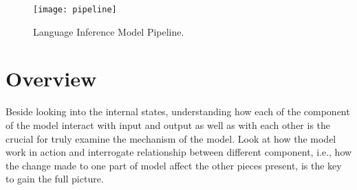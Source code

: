 \begin{figure}[htbp]
\centering
\vspace{-2mm}
 \texttt{[image: pipeline]}
 \caption{Language Inference Model Pipeline.}
\label{fig:projTransition}
\end{figure}

\section{Overview}
Beside looking into the internal states, understanding how each of the component of the model interact with input and output as well as with each other is the crucial for truly examine the mechanism of the model.
%
Look at how the model work in action and interrogate relationship between different component, i.e., how the change made to one part of model affect the other pieces present, is the key to gain the full picture.